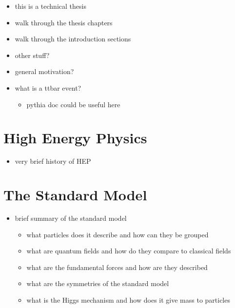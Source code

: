 \begin{itemize}
    \color{red}
    \item this is a technical thesis
    \item walk through the thesis chapters
    \item walk through the introduction sections
    \item other stuff?
    \item general motivation?
    \item what is a ttbar event?
    \begin{itemize}
        \item pythia doc could be useful here
    \end{itemize}
\end{itemize}


\section{High Energy Physics}

\begin{itemize}
    \color{red}
    \item very brief history of HEP
\end{itemize}

\section{The Standard Model}

\begin{itemize}
    \color{red}
    \item brief summary of the standard model
    \begin{itemize}
        \item what particles does it describe and how can they be grouped
        \item what are quantum fields and how do they compare to classical fields
        \item what are the fundamental forces and how are they described
        \item what are the symmetries of the standard model
        \item what is the Higgs mechanism and how does it give mass to particles
    \end{itemize}
\end{itemize}

